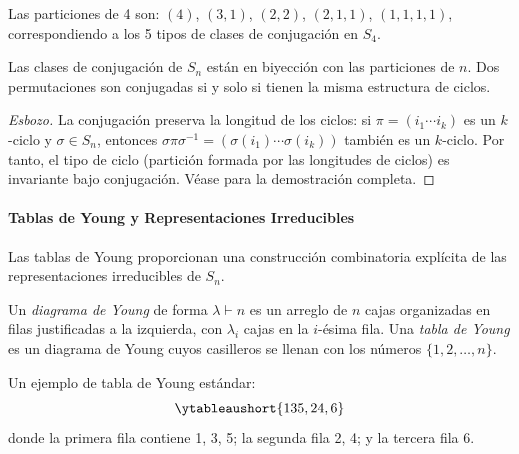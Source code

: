 \begin{example}[Particiones de $n=4$]
Las particiones de 4 son: $(4)$, $(3,1)$, $(2,2)$, $(2,1,1)$, $(1,1,1,1)$, correspondiendo a los 5 tipos de clases de conjugación en $S_4$.
\end{example}

\begin{theorem}\label{thm:conjugacy_classes_sn}
Las clases de conjugación de $S_n$ están en biyección con las particiones de $n$. Dos permutaciones son conjugadas si y solo si tienen la misma estructura de ciclos.
\end{theorem}

\begin{proof}[Esbozo]
La conjugación preserva la longitud de los ciclos: si $\pi = (i_1 \cdots i_k)$ es un $k$-ciclo y $\sigma \in S_n$, entonces $\sigma \pi \sigma^{-1} = (\sigma(i_1) \cdots \sigma(i_k))$ también es un $k$-ciclo. Por tanto, el tipo de ciclo (partición formada por las longitudes de ciclos) es invariante bajo conjugación. Véase \citep{sagan2001symmetric} para la demostración completa.
\end{proof}

\paragraph{Tablas de Young y Representaciones Irreducibles}

Las tablas de Young proporcionan una construcción combinatoria explícita de las representaciones irreducibles de $S_n$.

\begin{definition}\label{def:young_diagram}
Un \textit{diagrama de Young} de forma $\lambda \vdash n$ es un arreglo de $n$ cajas organizadas en filas justificadas a la izquierda, con $\lambda_i$ cajas en la $i$-ésima fila. Una \textit{tabla de Young} es un diagrama de Young cuyos casilleros se llenan con los números $\{1, 2, \ldots, n\}$.
\end{definition}

\begin{example}[Tabla de Young para $\lambda = (3,2,1) \vdash 6$]
Un ejemplo de tabla de Young estándar:
\begin{equation*}
\ytableaushort{135,24,6}
\end{equation*}
donde la primera fila contiene 1, 3, 5; la segunda fila 2, 4; y la tercera fila 6.
\end{example}

